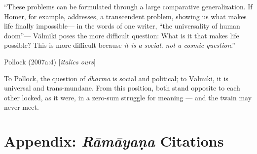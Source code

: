 \begin{myquote}
“These problems can be formulated through a large comparative generalization. If Homer, for example, addresses, a transcendent problem, showing us what makes life finally impossible— in the words of one writer, “the universality of human doom”— Vālmīki poses the more difficult question: What is it that makes life possible? This is more difficult because {\sl it is a social, not a cosmic question}.” 

\hfill Pollock (2007a:4) [{\sl italics ours}]
\end{myquote}

To Pollock, the question of {\sl dharma} is social and political; to Vālmīki, it is universal and trans-mundane. From this position, both stand opposite to each other locked, as it were, in a zero-sum struggle for meaning — and the twain may never meet. 

\newpage

\theendnotes

\newpage

\chapter*{Appendix: {\sl\bfseries Rāmāyaṇa} Citations}


\newpage
\thispagestyle{plain}


